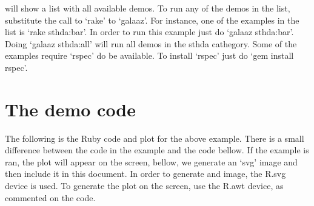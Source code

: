 \documentclass[]{article}
\begin{document}
will show a list with all available demos. To run any of the demos in
the list, substitute the call to `rake' to `galaaz'. For instance, one
of the examples in the list is `rake sthda:bar'. In order to run this
example just do `galaaz sthda:bar'. Doing `galaaz sthda:all' will run
all demos in the sthda cathegory. Some of the examples require `rspec'
do be available. To install `rspec' just do `gem install rspec'.

\section{The demo code}\label{the-demo-code}

The following is the Ruby code and plot for the above example. There is
a small difference between the code in the example and the code bellow.
If the example is ran, the plot will appear on the screen, bellow, we
generate an `svg' image and then include it in this document. In order
to generate and image, the R.svg device is used. To generate the plot on
the screen, use the R.awt device, as commented on the code.
\end{document}
